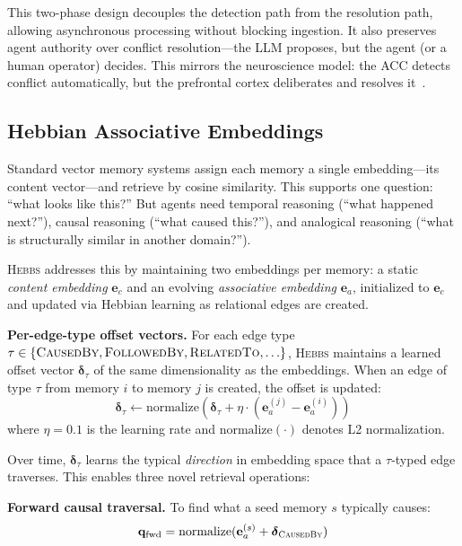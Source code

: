 \documentclass{article}
\begin{document}
This two-phase design decouples the detection path from the resolution path, allowing asynchronous processing without blocking ingestion. It also preserves agent authority over conflict resolution---the LLM proposes, but the agent (or a human operator) decides. This mirrors the neuroscience model: the ACC detects conflict automatically, but the prefrontal cortex deliberates and resolves it~\citep{botvinick2004,miller2001}.

\subsection{Hebbian Associative Embeddings}
\label{sec:hebbian}

Standard vector memory systems assign each memory a single embedding---its content vector---and retrieve by cosine similarity. This supports one question: ``what looks like this?'' But agents need temporal reasoning (``what happened next?''), causal reasoning (``what caused this?''), and analogical reasoning (``what is structurally similar in another domain?'').

\textsc{Hebbs} addresses this by maintaining two embeddings per memory: a static \emph{content embedding} $\mathbf{e}_c$ and an evolving \emph{associative embedding} $\mathbf{e}_a$, initialized to $\mathbf{e}_c$ and updated via Hebbian learning as relational edges are created.

\textbf{Per-edge-type offset vectors.} For each edge type $\tau \in \{\textsc{CausedBy}, \textsc{FollowedBy}, \textsc{RelatedTo}, \ldots\}$, \textsc{Hebbs} maintains a learned offset vector $\boldsymbol{\delta}_\tau$ of the same dimensionality as the embeddings. When an edge of type $\tau$ from memory $i$ to memory $j$ is created, the offset is updated:
\begin{equation}
    \boldsymbol{\delta}_\tau \leftarrow \text{normalize}\!\left(\boldsymbol{\delta}_\tau + \eta \cdot (\mathbf{e}_a^{(j)} - \mathbf{e}_a^{(i)})\right)
    \label{eq:hebbian}
\end{equation}
where $\eta = 0.1$ is the learning rate and $\text{normalize}(\cdot)$ denotes L2 normalization.

Over time, $\boldsymbol{\delta}_\tau$ learns the typical \emph{direction} in embedding space that a $\tau$-typed edge traverses. This enables three novel retrieval operations:

\textbf{Forward causal traversal.} To find what a seed memory $s$ typically causes:
\begin{equation}
    \mathbf{q}_{\text{fwd}} = \text{normalize}(\mathbf{e}_a^{(s)} + \boldsymbol{\delta}_{\textsc{CausedBy}})
\end{equation}
\end{document}
